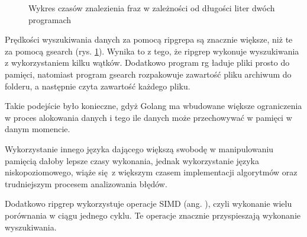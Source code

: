 \begin{figure}[ht]
    \centering
    \caption{Wykres czasów znalezienia fraz w zależności od długości liter dwóch programach}
    \label{fig:wykresPorównaniaCzasówWyszukań}
\end{figure}

Prędkości wyszukiwania danych za pomocą ripgrepa są znacznie większe, niż te
za pomocą gsearch (rys. \ref{fig:wykresPorównaniaCzasówWyszukań}). Wynika to z
tego, że ripgrep wykonuje wyszukiwania z wykorzystaniem kilku wątków. Dodatkowo 
program rg ładuje pliki prosto do pamięci, natomiast program gsearch rozpakowuje
zawartość pliku archiwum do folderu, a następnie czyta zawartość każdego pliku.

Takie podejście było konieczne, gdyż Golang ma wbudowane większe ograniczenia w 
proces alokowania danych i tego ile danych może przechowywać w pamięci w danym momencie.

Wykorzystanie innego języka dającego większą swobodę w manipulowaniu pamięcią 
dałoby lepsze czasy wykonania, jednak wykorzystanie języka niskopoziomowego,
wiąże się z większym czasem implementacji algorytmów oraz trudniejszym procesem
analizowania błędów.

Dodatkowo ripgrep wykorzystuje operacje SIMD (ang. ),
czyli wykonanie wielu porównania w ciągu jednego cyklu. Te operacje znacznie
przyspieszają wykonanie wyszukiwania.

